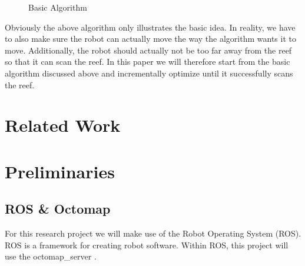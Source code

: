 \documentclass[twoside, 12pt]{article}
\begin{document}
\begin{figure}
\vspace{-26pt}
  \begin{center}
  \end{center}
\vspace{-20pt}
  \caption{Basic Algorithm}
  \label{fig:basicAlgorithm}
\end{figure}

\begin{figure}
\vspace{-50pt}
\end{figure}

Obviously the above algorithm only illustrates the basic idea. In reality, we have to also make sure the robot can actually move the way the algorithm wants it to move. Additionally, the robot should actually not be too far away from the reef so that it can scan the reef. In this paper we will therefore start from the basic algorithm discussed above and incrementally optimize until it successfully scans the reef. \\

\section{Related Work}
\label{sec:relatedworks}

  
\section{Preliminaries}
\label{sec:preliminaries}

\subsection{ROS \& Octomap}
For this research project we will make use of the Robot Operating System (ROS). ROS is a framework for creating robot software.  Within ROS, this project will use the octomap\_server \cite{hornung13auro}.\\
\end{document}
